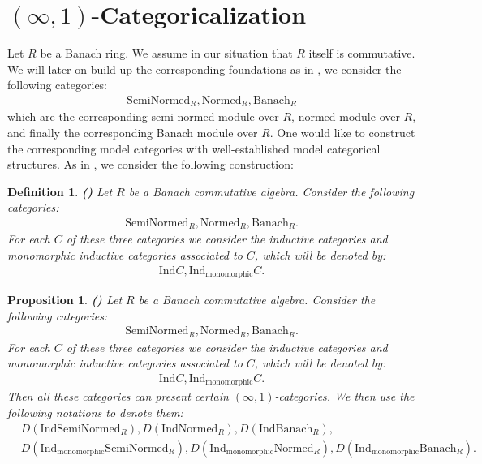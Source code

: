 \documentclass[12pt]{book}
\newtheorem{definition}{Definition}
\newtheorem{proposition}{Proposition}
\begin{document}
\newpage
\section{$(\infty,1)$-Categoricalization}

\indent Let $R$ be a Banach ring. We assume in our situation that $R$ itself is commutative. We will later on build up the corresponding foundations as in \cite{BBBK}, we consider the following categories:
\begin{align}
\mathrm{SemiNormed}_R, \mathrm{Normed}_R, \mathrm{Banach}_R
\end{align}
which are the corresponding semi-normed module over $R$, normed module over $R$, and finally the corresponding Banach module over $R$. One would like to construct the corresponding model categories with well-established model categorical structures. As in \cite{BBBK}, we consider the following construction:

\begin{definition}\mbox{\textbf{(\cite[Definition 3.1]{BBBK})}} Let $R$ be a Banach commutative algebra. Consider the following categories:
\begin{align}
\mathrm{SemiNormed}_R, \mathrm{Normed}_R, \mathrm{Banach}_R.
\end{align}
For each $C$ of these three categories we consider the inductive categories and monomorphic inductive categories associated to $C$, which will be denoted by:
\begin{align}
\mathrm{Ind}C,\mathrm{Ind}_\text{monomorphic}C.
\end{align}
\end{definition}


\begin{proposition}\mbox{\textbf{(\cite[Theorem 3.14]{BBBK})}}
Let $R$ be a Banach commutative algebra. Consider the following categories:
\begin{align}
\mathrm{SemiNormed}_R, \mathrm{Normed}_R, \mathrm{Banach}_R.
\end{align}
For each $C$ of these three categories we consider the inductive categories and monomorphic inductive categories associated to $C$, which will be denoted by:
\begin{align}
\mathrm{Ind}C,\mathrm{Ind}_\text{monomorphic}C.
\end{align}
Then all these categories can present certain $(\infty,1)$-categories. We then use the following notations to denote them:
\begin{align}
&D(\mathrm{Ind}\mathrm{SemiNormed}_R), D(\mathrm{Ind}\mathrm{Normed}_R), D(\mathrm{Ind}\mathrm{Banach}_R),\\
&D(\mathrm{Ind}_\text{monomorphic}\mathrm{SemiNormed}_R), D(\mathrm{Ind}_\text{monomorphic}\mathrm{Normed}_R), D(\mathrm{Ind}_\text{monomorphic}\mathrm{Banach}_R).
\end{align}
\end{proposition}
\end{document}

